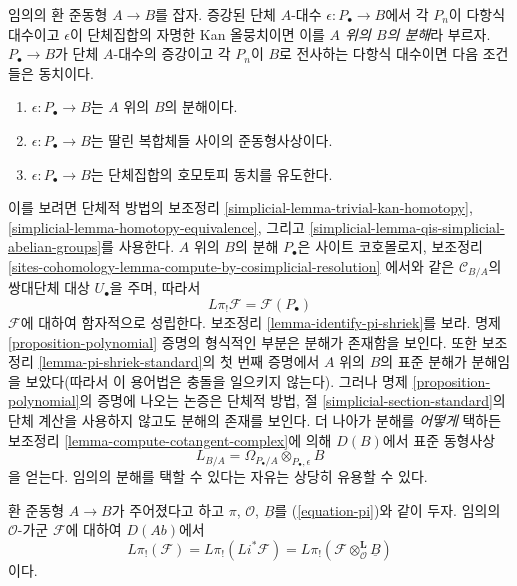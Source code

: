 \begin{remark}[분해]
\label{remark-resolution}
임의의 환 준동형 $A\to B$를 잡자. 증강된 단체 $A$-대수
$\epsilon:P_\bullet\to B$에서 각 $P_n$이 다항식 대수이고 $\epsilon$이
단체집합의 자명한 Kan 올뭉치이면 이를 {\it $A$ 위의 $B$의 분해}라
부르자. $P_\bullet\to B$가 단체 $A$-대수의 증강이고 각 $P_n$이 $B$로
전사하는 다항식 대수이면 다음 조건들은 동치이다.
\begin{enumerate}
\item $\epsilon:P_\bullet\to B$는 $A$ 위의 $B$의 분해이다.
\item $\epsilon:P_\bullet\to B$는 딸린 복합체들 사이의 준동형사상이다.
\item $\epsilon:P_\bullet\to B$는 단체집합의 호모토피 동치를 유도한다.
\end{enumerate}
이를 보려면 단체적 방법의 보조정리
\ref{simplicial-lemma-trivial-kan-homotopy},
\ref{simplicial-lemma-homotopy-equivalence}, 그리고
\ref{simplicial-lemma-qis-simplicial-abelian-groups}를 사용한다. $A$ 위의
$B$의 분해 $P_\bullet$은 사이트 코호몰로지, 보조정리
\ref{sites-cohomology-lemma-compute-by-cosimplicial-resolution}
에서와 같은 $\mathcal{C}_{B/A}$의 쌍대단체 대상 $U_\bullet$을 주며,
따라서
$$
L\pi_!\mathcal{F} = \mathcal{F}(P_\bullet)
$$
$\mathcal{F}$에 대하여 함자적으로 성립한다. 보조정리
\ref{lemma-identify-pi-shriek}를 보라. 명제 \ref{proposition-polynomial}
증명의 형식적인 부분은 분해가 존재함을 보인다. 또한 보조정리
\ref{lemma-pi-shriek-standard}의 첫 번째 증명에서 $A$ 위의 $B$의 표준
분해가 분해임을 보았다(따라서 이 용어법은 충돌을 일으키지 않는다).
그러나 명제 \ref{proposition-polynomial}의 증명에 나오는 논증은 단체적
방법, 절 \ref{simplicial-section-standard}의 단체 계산을 사용하지 않고도
분해의 존재를 보인다. 더 나아가 분해를 {\it 어떻게} 택하든 보조정리
\ref{lemma-compute-cotangent-complex}에 의해 $D(B)$에서 표준 동형사상
$$
L_{B/A} = \Omega_{P_\bullet/A} \otimes_{P_\bullet, \epsilon} B
$$
을 얻는다. 임의의 분해를 택할 수 있다는 자유는 상당히 유용할 수 있다.
\end{remark}

\begin{lemma}
\label{lemma-O-homology-B-homology}
환 준동형 $A\to B$가 주어졌다고 하고 $\pi$, $\mathcal{O}$,
$\underline{B}$를 (\ref{equation-pi})와 같이 두자. 임의의
$\mathcal{O}$-가군 $\mathcal{F}$에 대하여 $D(\textit{Ab})$에서
$$
L\pi_!(\mathcal{F}) = L\pi_!(Li^*\mathcal{F}) =
L\pi_!(\mathcal{F} \otimes_\mathcal{O}^\mathbf{L} \underline{B})
$$
이다.
\end{lemma}

